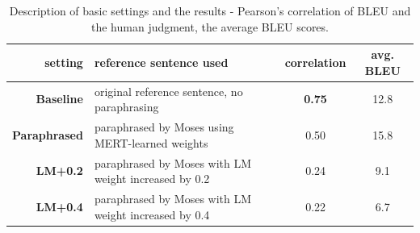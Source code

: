 \documentclass[11pt]{article}
\begin{document}
\begin{table}[ht]
\begin{tabular}{r|l|c|c}
setting & reference sentence used & correlation & avg. BLEU \\
\hline
\textbf{Baseline} & original reference sentence, no paraphrasing & \textbf{0.75} & 12.8 \\
\textbf{Paraphrased} & paraphrased by Moses using MERT-learned weights  & 0.50  & 15.8 \\
\textbf{LM+0.2}  & paraphrased by Moses with LM weight increased by 0.2  & 0.24 & 9.1 \\
\textbf{LM+0.4} & paraphrased by Moses with LM weight increased by 0.4  & 0.22 & 6.7 \\
\end{tabular}
\caption{Description of basic settings and the results - Pearson's correlation of BLEU and the
human judgment, the average BLEU scores.} 
\label{settings}
\end{table}
\end{document}
